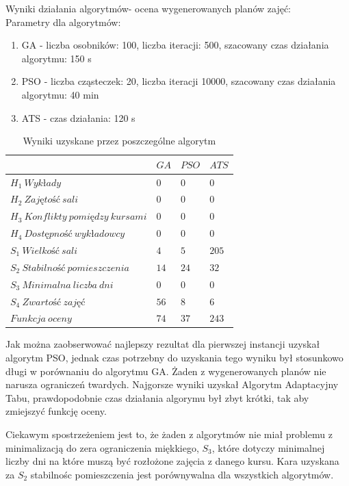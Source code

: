 \par Wyniki działania algorytmów- ocena wygenerowanych planów zajęć: \\
Parametry dla algorytmów:
\begin{enumerate}
\item GA - liczba osobników: 100, liczba iteracji: 500, szacowany czas działania algorytmu: 150 s
\item PSO - liczba cząsteczek: 20, liczba iteracji 10000, szacowany czas działania algorytmu: 40 min
\item ATS - czas działania: 120 s
\end{enumerate}
\begin{table}[H]
\begin{center}

\begin{tabular}{ |l|l|l|l| }
\hline
 & $GA$ & $PSO$ & $ATS$\\
\hline
${H}_{1}\ Wykłady$ & $0$ & $0$ & $0$\\
\hline
$H_{2}\ Zajętość\ sali$ & $0$ & $0$ & $0$\\
\hline
$H_{3}\ Konflikty\ pomiędzy\ kursami$ & $0$ & $0$ & $0$ \\
\hline
$H_{4}\ Dostępność\ wykładowcy$ & $0$ & $0$ & $0$ \\
\hline
$S_{1}\ Wielkość\ sali$ & $4$ & $5$ & $205$ \\
\hline
$S_{2}\ Stabilność\ pomieszczenia$ & $14$ & $24$ & $32$ \\
\hline
$S_{3}\ Minimalna\ liczba\ dni$ & $0$ & $0$ & $0$ \\
\hline
$S_{4}\ Zwartość\ zajęć$ & $56$ & $8$ & $6$ \\
\hline
$Funkcja\ oceny$ & $74$ & $37$ & $243$ \\
\hline
\end{tabular}
\end{center}
\caption {Wyniki uzyskane przez poszczególne algorytm}
\end{table}
\par Jak można zaobserwować najlepszy rezultat dla pierwszej instancji uzyskał algorytm PSO, jednak czas potrzebny do uzyskania tego wyniku był stosunkowo długi w porównaniu do algorytmu GA. Żaden z wygenerowanych planów nie narusza ograniczeń twardych. Najgorsze wyniki uzyskał Algorytm Adaptacyjny Tabu, prawdopodobnie czas działania algorymu był zbyt krótki, tak aby zmiejszyć funkcję oceny.
\par Ciekawym spostrzeżeniem jest to, że żaden z algorytmów nie miał problemu z minimalizacją do zera ograniczenia miękkiego,  $S_{3}$, które dotyczy minimalnej liczby dni na które muszą być rozłożone zajęcia z danego kursu. Kara uzyskana za $S_{2}$ stabilnośc pomieszczenia jest porównywalna dla wszystkich algorytmów.
